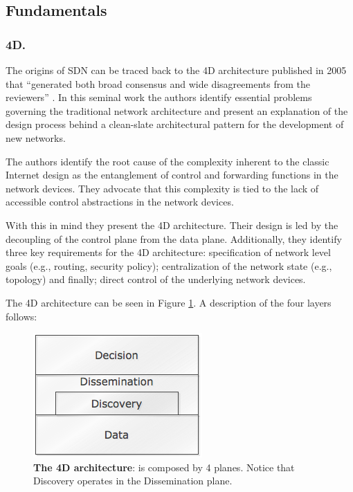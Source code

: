 \subsection{Fundamentals} 
\subsubsection{4D.} The origins of SDN can be traced back to the 4D architecture published in  2005 that ``generated both broad consensus and wide disagreements from
the reviewers''  \cite{Greenberg:2005boa}. In this seminal work the authors identify essential
problems governing  the traditional network architecture and  present an
explanation of the design process behind a clean-slate architectural
pattern for  the development of new networks. 

The authors identify  the root cause of the complexity inherent to the
classic Internet design as the  entanglement  of control and
forwarding functions in the network devices. They advocate that this complexity is tied to the lack of accessible control abstractions in the network devices. 

 With this in mind they present the  4D architecture. Their  design is led by the
decoupling of the control plane from the data plane. Additionally, they
identify three key requirements for the 4D architecture: specification of  network level goals (e.g., routing,
security policy);  centralization of the network state (e.g.,
topology) and finally; direct control of the underlying network
devices.

The 4D architecture can be seen
in Figure \ref{fig:4d}. A description of the four layers
follows: 

\begin{figure}
  \centering 
  \footnotesize
  \includegraphics[scale=0.5]{pic/4d.png}
  \caption[The 4D architecture]{\textbf{The 4D architecture}: is
    composed by 4 planes. Notice that Discovery operates
  in the Dissemination plane.}
  \label{fig:4d}
\end{figure}


